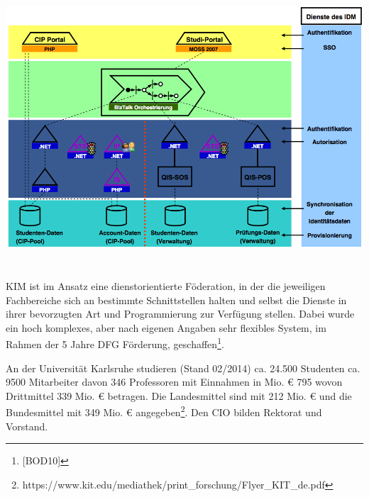 \documentclass[a4paper]{article}
\makeatletter
\newcommand\captionof[1]{\def\@captype{#1}\caption}
\makeatother
\begin{document}
{\centering \includegraphics[width=15.404cm,height=10.433cm]{INMAusarbeitung02-img012.png}
\captionof{figure}[Erreichtes im Überblick für Karlsruhe (Juling Best Practice Workshop 2008)]{Erreichtes im Überblick
für Karlsruhe \textcolor[rgb]{1.0,0.2,0.2}{(}\textcolor{red}{Juling Best Practice Workshop 2008)}}
\par}
{\sffamily
KIM ist im Ansatz eine dienstorientierte F\"{o}deration, in der die jeweiligen Fachbereiche sich an bestimmte
Schnittstellen halten und selbst die Dienste in ihrer bevorzugten Art und Programmierung zur Verfügung stellen. Dabei
wurde ein hoch komplexes, aber nach eigenen Angaben sehr flexibles System, im Rahmen der 5 Jahre DFG Förderung,
geschaffen\footnote{[BOD10]}.}


\bigskip

{\sffamily
An der Universität Karlsruhe studieren (Stand 02/2014) ca. 24.500 Studenten ca. 9500 Mitarbeiter davon 346 Professoren
mit Einnahmen in Mio. € 795 wovon Drittmittel 339 Mio. € betragen. Die Landesmittel sind mit 212 Mio. € und die
Bundesmittel mit 349 Mio. € angegeben\footnote{https://www.kit.edu/mediathek/print\_forschung/Flyer\_KIT\_de.pdf}. Den
CIO bilden Rektorat und Vorstand.}
\end{document}

